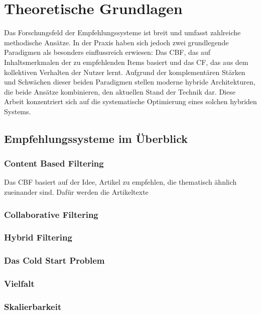 \section{Theoretische Grundlagen}
Das Forschungsfeld der Empfehlungssysteme ist breit und umfasst zahlreiche methodische
Ansätze. In der Praxis haben sich jedoch zwei grundlegende Paradigmen als besonders einflussreich erwiesen:
Das \ac{CBF}, das auf Inhaltsmerkmalen der zu empfehlenden Items basiert und das \ac{CF}, das aus dem kollektiven
Verhalten der Nutzer lernt. Aufgrund der komplementären Stärken und Schwächen dieser beiden Paradigmen
stellen moderne hybride Architekturen, die beide Ansätze kombinieren, den aktuellen
Stand der Technik dar. Diese Arbeit konzentriert sich auf die systematische Optimierung eines solchen hybriden Systems.

\subsection{Empfehlungssysteme im Überblick}
\subsubsection{Content Based Filtering}
Das \ac{CBF} basiert auf der Idee, Artikel zu empfehlen, die thematisch ähnlich zueinander sind. Dafür werden
die Artikeltexte 
\subsubsection{Collaborative Filtering}

\subsubsection{Hybrid Filtering}

\subsubsection{Das Cold Start Problem}

\subsubsection{Vielfalt}

\subsubsection{Skalierbarkeit}

